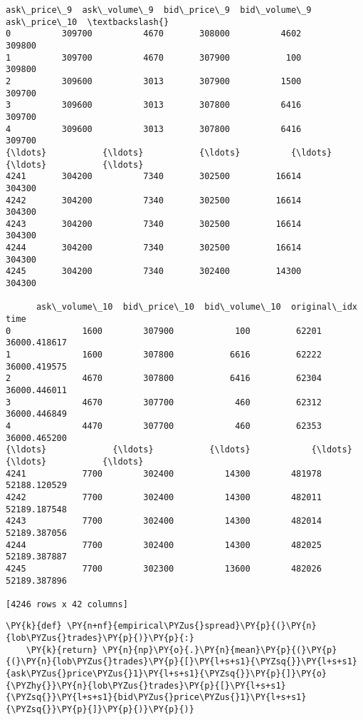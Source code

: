 \documentclass[11pt]{article}
\begin{document}
\begin{scriptsize}
\begin{tcolorbox}[breakable, size=fbox, boxrule=.5pt, pad at break*=1mm, opacityfill=0]
\begin{Verbatim}[commandchars=\\\{\}]
      ask\_price\_9  ask\_volume\_9  bid\_price\_9  bid\_volume\_9  ask\_price\_10  \textbackslash{}
0          309700          4670       308000          4602        309800
1          309700          4670       307900           100        309800
2          309600          3013       307900          1500        309700
3          309600          3013       307800          6416        309700
4          309600          3013       307800          6416        309700
{\ldots}           {\ldots}           {\ldots}          {\ldots}           {\ldots}           {\ldots}
4241       304200          7340       302500         16614        304300
4242       304200          7340       302500         16614        304300
4243       304200          7340       302500         16614        304300
4244       304200          7340       302500         16614        304300
4245       304200          7340       302400         14300        304300

      ask\_volume\_10  bid\_price\_10  bid\_volume\_10  original\_idx          time
0              1600        307900            100         62201  36000.418617
1              1600        307800           6616         62222  36000.419575
2              4670        307800           6416         62304  36000.446011
3              4670        307700            460         62312  36000.446849
4              4470        307700            460         62353  36000.465200
{\ldots}             {\ldots}           {\ldots}            {\ldots}           {\ldots}           {\ldots}
4241           7700        302400          14300        481978  52188.120529
4242           7700        302400          14300        482011  52189.187548
4243           7700        302400          14300        482014  52189.387056
4244           7700        302400          14300        482025  52189.387887
4245           7700        302300          13600        482026  52189.387896

[4246 rows x 42 columns]
\end{Verbatim}
\end{tcolorbox}
\end{scriptsize}
        
    \begin{tcolorbox}[breakable, size=fbox, boxrule=1pt, pad at break*=1mm,colback=cellbackground, colframe=cellborder]
\begin{Verbatim}[commandchars=\\\{\}]
\PY{k}{def} \PY{n+nf}{empirical\PYZus{}spread}\PY{p}{(}\PY{n}{lob\PYZus{}trades}\PY{p}{)}\PY{p}{:}
    \PY{k}{return} \PY{n}{np}\PY{o}{.}\PY{n}{mean}\PY{p}{(}\PY{p}{(}\PY{n}{lob\PYZus{}trades}\PY{p}{[}\PY{l+s+s1}{\PYZsq{}}\PY{l+s+s1}{ask\PYZus{}price\PYZus{}1}\PY{l+s+s1}{\PYZsq{}}\PY{p}{]}\PY{o}{\PYZhy{}}\PY{n}{lob\PYZus{}trades}\PY{p}{[}\PY{l+s+s1}{\PYZsq{}}\PY{l+s+s1}{bid\PYZus{}price\PYZus{}1}\PY{l+s+s1}{\PYZsq{}}\PY{p}{]}\PY{p}{)}\PY{p}{)}
\end{Verbatim}
\end{tcolorbox}
\end{document}
